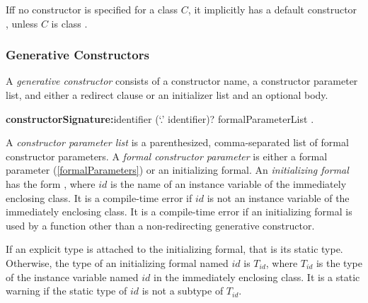 \documentclass{article}
\begin{document}


\LMHash{}
If{}f no constructor is specified for a class $C$, it implicitly has a default constructor , unless $C$ is class .


\subsubsection{Generative Constructors}

\LMHash{}
A {\em generative constructor} consists of a constructor name, a constructor parameter list, and either a redirect clause or an initializer list and an optional body.

\begin{grammar}
{\bf constructorSignature:}identifier (`{\escapegrammar .}' identifier)? formalParameterList
  .
\end{grammar}

\LMHash{}
A {\em constructor parameter list} is a parenthesized, comma-separated list of formal constructor parameters.
A {\em formal constructor parameter} is either a formal parameter (\ref{formalParameters}) or an initializing formal.
An {\em initializing formal} has the form , where $id$ is the name of an instance variable of the immediately enclosing class.
It is a compile-time error if $id$ is not an instance variable of the immediately enclosing class.
It is a compile-time error if an initializing formal is used by a function other than a non-redirecting generative constructor.

\LMHash{}
If an explicit type is attached to the initializing formal, that is its static type.
Otherwise, the type of an initializing formal named $id$ is $T_{id}$, where $T_{id}$ is the type of the instance variable named $id$ in the immediately enclosing class.
It is a static warning if the static type of $id$ is not a subtype of $T_{id}$.
\end{document}
